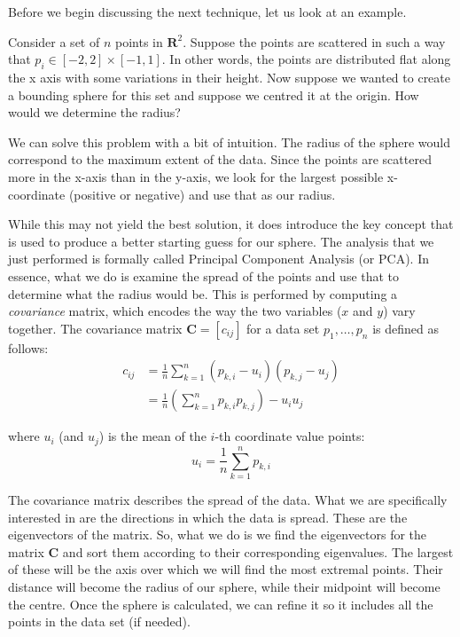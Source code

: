     Before we begin discussing the next technique, let us look at an example.
    \begin{exmp}
      Consider a set of $n$ points in $\mathbf{R}^2$. Suppose the points are
      scattered in such a way that $p_i \in [-2, 2] \times [-1, 1]$. In other
      words, the points are distributed flat along the x axis with some
      variations in their height. Now suppose we wanted to create a bounding
      sphere for this set and suppose we centred it at the origin. How would we
      determine the radius?
    \end{exmp}

    We can solve this problem with a bit of intuition. The radius of the sphere
    would correspond to the maximum extent of the data. Since the points are
    scattered more in the x-axis than in the y-axis, we look for the largest
    possible x-coordinate (positive or negative) and use that as our radius.

    While this may not yield the best solution, it does introduce the key
    concept that is used to produce a better starting guess for our sphere. The
    analysis that we just performed is formally called Principal Component
    Analysis (or PCA). In essence, what we do is examine the spread of the
    points and use that to determine what the radius would be. This is performed
    by computing a \emph{covariance} matrix, which encodes the way the two
    variables ($x$ and $y$) vary together. The covariance matrix $\mathbf{C} =
    [c_{ij}]$ for a data set $p_1, \ldots, p_n$ is defined as follows:
    \begin{align*}
      c_{ij} &= \frac{1}{n}\sum_{k = 1}^n(p_{k, i} - u_i)(p_{k, j} - u_j) \\
      &= \frac{1}{n}\left( \sum_{k = 1}^n p_{k, i}p_{k, j} \right) - u_iu_j
    \end{align*}
    
    where $u_i$ (and $u_j$) is the mean of the $i$-th coordinate value points:
    \[
      u_i = \frac{1}{n}\sum_{k = 1}^n p_{k, i}
    \]

    The covariance matrix describes the spread of the data. What we are
    specifically interested in are the directions in which the data is spread.
    These are the eigenvectors of the matrix. So, what we do is we find the
    eigenvectors for the matrix $\mathbf{C}$ and sort them according to their
    corresponding eigenvalues. The largest of these will be the axis over which
    we will find the most extremal points. Their distance will become the radius
    of our sphere, while their midpoint will become the centre. Once the sphere
    is calculated, we can refine it so it includes all the points in the  data
    set (if needed).

